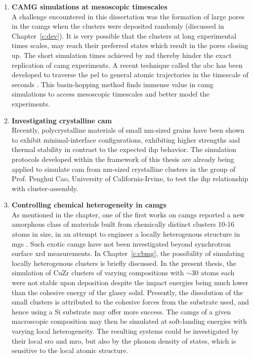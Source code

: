 \begin{enumerate}[leftmargin=*]
\item \textbf{CAMG simulations at mesoscopic timescales}\\
A challenge encountered in this dissertation was the formation of large pores in the \gls{camg}s when the clusters were deposited randomly (discussed in Chapter~\ref{c:dev}). It is very possible that the clusters at long experimental times scales, may reach their preferred states which result in the pores closing up. The short simulation times achieved by \gls{md} thereby hinder the exact replication of \gls{camg} experiments. A recent technique called the \gls{abc} has been developed to traverse the \gls{pel} to general atomic trajectories in the timescale of seconds \cite{Cao2012,Fan2018}. This basin-hopping method finds immense value in \gls{camg} simulations to access mesoscopic timescales and better model the experiments.

\item \textbf{Investigating crystalline \gls{cam}}\\
Recently, polycrystalline materials of small nm-sized grains have been shown to exhibit minimal-interface configurations, exhibiting higher strengths and thermal stability \cite{Li2020,Hu2022} in contrast to the expected \gls{ihp} behavior. The simulation protocols developed within the framework of this thesis are already being applied to simulate \gls{cam} from nm-sized crystalline clusters in the group of Prof. Penghui Cao, University of California-Irvine, to test the \gls{ihp} relationship with cluster-assembly.

\item \textbf{Controlling chemical heterogeneity in \gls{camg}s}\\
As mentioned in the  chapter, one of the first works on \gls{camg}s reported a new amorphous class of materials built from chemically distinct clusters 10-16 atoms in size, in an attempt to engineer a locally heterogenous structure in \gls{mg}s \cite{Kartouzian2013,Kartouzian2014}. Such exotic \gls{camg}s have not been investigated beyond synchrotron surface \gls{xrd} measurements. In Chapter~\ref{c:cbmg}, the possibility of simulating locally heterogenous clusters is briefly discussed. In the present thesis, the simulation of CuZr clusters of varying compositions with $\sim$30 atoms each were not stable upon deposition despite the impact energies being much lower than the cohesive energy of the glassy solid. Presently, the dissolution of the small clusters is attributed to the cohesive forces from the \cz substrate used, and hence using a Si substrate may offer more success. The \gls{camg}s of a given macroscopic composition may then be simulated at soft-landing energies with varying local heterogeneity. The resulting systems could be investigated by their local \gls{sro} and \gls{mro}, but also by the phonon density of states, which is sensitive to the local atomic structure.




\end{enumerate}

